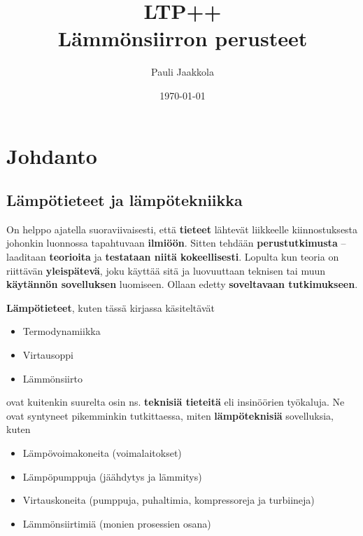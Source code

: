 \documentclass[12pt,a4paper,finnish]{book}
\title{LTP++\\Lämmönsiirron perusteet}
\date{\today}
\author{Pauli Jaakkola}
\begin{document}
\maketitle
\newpage
{}
\setcounter{tocdepth}{3}
\tableofcontents
\newpage
{}
\setcounter{secnumdepth}{3}

\chapter*{Johdanto} %
\renewcommand{\thesection}{\arabic{section}}

\section{Lämpötieteet ja lämpötekniikka} %

On helppo ajatella suoraviivaisesti, että \textbf{tieteet} lähtevät liikkeelle kiinnostuksesta johonkin 
luonnossa tapahtuvaan \textbf{ilmiöön}. 
Sitten tehdään \textbf{perustutkimusta} -- laaditaan \textbf{teorioita} ja \textbf{testataan niitä kokeellisesti}. 
Lopulta kun teoria on riittävän \textbf{yleispätevä}, joku käyttää sitä ja luovuuttaan teknisen tai muun \textbf{käytännön 
sovelluksen} luomiseen. Ollaan edetty \textbf{soveltavaan tutkimukseen}.

\textbf{Lämpötieteet}, kuten tässä kirjassa käsiteltävät

\begin{itemize}
 \item Termodynamiikka
 \item Virtausoppi
 \item Lämmönsiirto
\end{itemize}

ovat kuitenkin suurelta osin ns. \textbf{teknisiä tieteitä} eli insinöörien työkaluja. Ne ovat 
syntyneet pikemminkin tutkittaessa, miten \textbf{lämpöteknisiä} sovelluksia, kuten 

\begin{itemize}
 \item Lämpövoimakoneita (voimalaitokset)
 \item Lämpöpumppuja (jäähdytys ja lämmitys)
 \item Virtauskoneita (pumppuja, puhaltimia, kompressoreja ja turbiineja)
 \item Lämmönsiirtimiä (monien prosessien osana)
\end{itemize}
\end{document}
